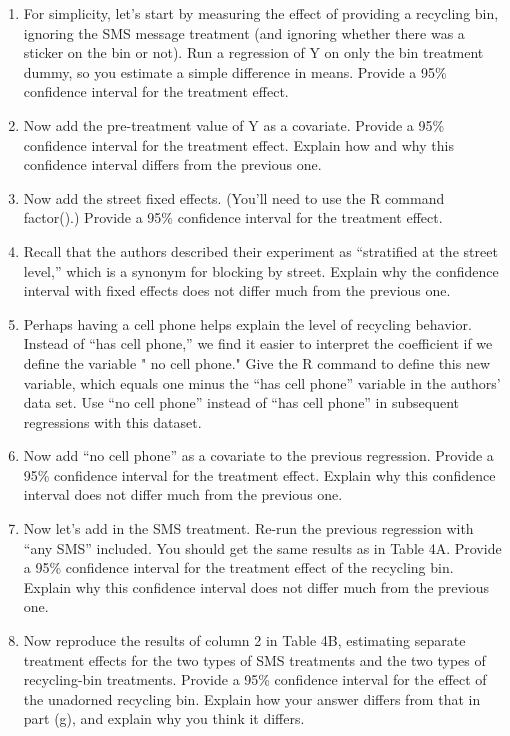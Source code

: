 \documentclass[
]{article}
\begin{document}
\begin{enumerate}
\def\labelenumi{\arabic{enumi}.}
\item
  For simplicity, let's start by measuring the effect of providing a
  recycling bin, ignoring the SMS message treatment (and ignoring
  whether there was a sticker on the bin or not). Run a regression of Y
  on only the bin treatment dummy, so you estimate a simple difference
  in means. Provide a 95\% confidence interval for the treatment effect.
\item
  Now add the pre-treatment value of Y as a covariate. Provide a 95\%
  confidence interval for the treatment effect. Explain how and why this
  confidence interval differs from the previous one.
\item
  Now add the street fixed effects. (You'll need to use the R command
  factor().) Provide a 95\% confidence interval for the treatment
  effect.
\item
  Recall that the authors described their experiment as ``stratified at
  the street level,'' which is a synonym for blocking by street. Explain
  why the confidence interval with fixed effects does not differ much
  from the previous one.
\item
  Perhaps having a cell phone helps explain the level of recycling
  behavior. Instead of ``has cell phone,'' we find it easier to
  interpret the coefficient if we define the variable " no cell phone."
  Give the R command to define this new variable, which equals one minus
  the ``has cell phone'' variable in the authors' data set. Use ``no
  cell phone'' instead of ``has cell phone'' in subsequent regressions
  with this dataset.
\item
  Now add ``no cell phone'' as a covariate to the previous regression.
  Provide a 95\% confidence interval for the treatment effect. Explain
  why this confidence interval does not differ much from the previous
  one.
\item
  Now let's add in the SMS treatment. Re-run the previous regression
  with ``any SMS'' included. You should get the same results as in Table
  4A. Provide a 95\% confidence interval for the treatment effect of the
  recycling bin. Explain why this confidence interval does not differ
  much from the previous one.
\item
  Now reproduce the results of column 2 in Table 4B, estimating separate
  treatment effects for the two types of SMS treatments and the two
  types of recycling-bin treatments. Provide a 95\% confidence interval
  for the effect of the unadorned recycling bin. Explain how your answer
  differs from that in part (g), and explain why you think it differs.
\end{enumerate}
\end{document}
